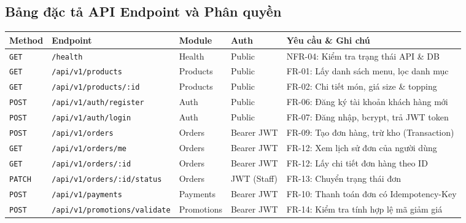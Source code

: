 \documentclass[11pt, a4paper]{article}
\begin{document}
\subsection{Bảng đặc tả API Endpoint và Phân quyền}

\begin{table}[h!]
	\small
	\centering
	\begin{tabular}{p{1.4cm} p{4.6cm} p{2cm} p{1.8cm} p{4.6cm}}
		\toprule
		\rowcolor{tableheader}
		\textbf{Method} & \textbf{Endpoint}                    & \textbf{Module} & \textbf{Auth} & \textbf{Yêu cầu \& Ghi chú}                \\
		\midrule
		\texttt{GET}    & \texttt{/health}                     & Health          & Public        & NFR-04: Kiểm tra trạng thái API \& DB      \\
		\texttt{GET}    & \texttt{/api/v1/products}            & Products        & Public        & FR-01: Lấy danh sách menu, lọc danh mục    \\
		\texttt{GET}    & \texttt{/api/v1/products/:id}        & Products        & Public        & FR-02: Chi tiết món, giá size \& topping   \\
		\texttt{POST}   & \texttt{/api/v1/auth/register}       & Auth            & Public        & FR-06: Đăng ký tài khoản khách hàng mới    \\
		\texttt{POST}   & \texttt{/api/v1/auth/login}          & Auth            & Public        & FR-07: Đăng nhập, bcrypt, trả JWT token    \\
		\texttt{POST}   & \texttt{/api/v1/orders}              & Orders          & Bearer JWT    & FR-09: Tạo đơn hàng, trừ kho (Transaction) \\
		\texttt{GET}    & \texttt{/api/v1/orders/me}           & Orders          & Bearer JWT    & FR-12: Xem lịch sử đơn của người dùng      \\
		\texttt{GET}    & \texttt{/api/v1/orders/:id}          & Orders          & Bearer JWT    & FR-12: Lấy chi tiết đơn hàng theo ID       \\
		\texttt{PATCH}  & \texttt{/api/v1/orders/:id/status}   & Orders          & JWT (Staff)   & FR-13: Chuyển trạng thái đơn               \\
		\texttt{POST}   & \texttt{/api/v1/payments}            & Payments        & Bearer JWT    & FR-10: Thanh toán đơn có Idempotency-Key   \\
		\texttt{POST}   & \texttt{/api/v1/promotions/validate} & Promotions      & Bearer JWT    & FR-14: Kiểm tra tính hợp lệ mã giảm giá    \\
		\bottomrule
	\end{tabular}
\end{table}
\end{document}
